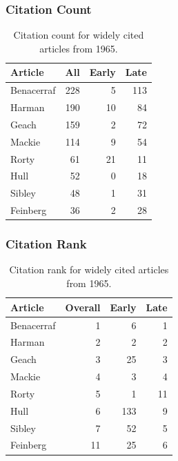 \documentclass[
  10pt,
  letterpaper,
  DIV=11,
  numbers=noendperiod,
  twoside]{scrartcl}
\begin{document}
\subsubsection*{Citation Count}\label{sec-count-1965}

\begin{longtable}[]{@{}lrrr@{}}

\caption{\label{tbl-citation-count-1965}Citation count for widely cited
articles from 1965.}

\tabularnewline

\toprule\noalign{}
Article & All & Early & Late \\
\midrule\noalign{}
\endhead
\bottomrule\noalign{}
\endlastfoot
Benacerraf & 228 & 5 & 113 \\
Harman & 190 & 10 & 84 \\
Geach & 159 & 2 & 72 \\
Mackie & 114 & 9 & 54 \\
Rorty & 61 & 21 & 11 \\
Hull & 52 & 0 & 18 \\
Sibley & 48 & 1 & 31 \\
Feinberg & 36 & 2 & 28 \\

\end{longtable}

\subsubsection*{Citation Rank}\label{sec-rank-1965}

\begin{longtable}[]{@{}lrrr@{}}

\caption{\label{tbl-citation-rank-1965}Citation rank for widely cited
articles from 1965.}

\tabularnewline

\toprule\noalign{}
Article & Overall & Early & Late \\
\midrule\noalign{}
\endhead
\bottomrule\noalign{}
\endlastfoot
Benacerraf & 1 & 6 & 1 \\
Harman & 2 & 2 & 2 \\
Geach & 3 & 25 & 3 \\
Mackie & 4 & 3 & 4 \\
Rorty & 5 & 1 & 11 \\
Hull & 6 & 133 & 9 \\
Sibley & 7 & 52 & 5 \\
Feinberg & 11 & 25 & 6 \\

\end{longtable}
\end{document}
